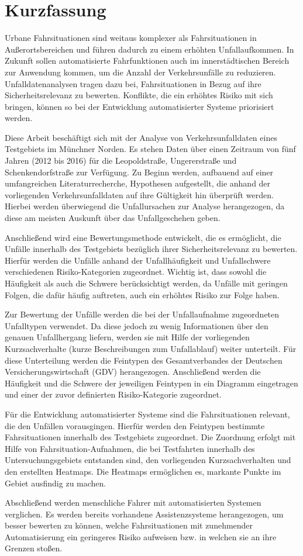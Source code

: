 \chapter{Kurzfassung}


Urbane Fahrsituationen sind weitaus komplexer als Fahrsituationen in Außerortsbereichen und führen dadurch zu einem erhöhten Unfallaufkommen. In Zukunft sollen automatisierte Fahrfunktionen auch im innerstädtischen Bereich zur Anwendung kommen, um die Anzahl der Verkehrsunfälle zu reduzieren. Unfalldatenanalysen tragen dazu bei, Fahrsituationen in Bezug auf ihre Sicherheitsrelevanz zu bewerten. Konflikte, die ein erhöhtes Risiko mit sich bringen, können so bei der Entwicklung automatisierter Systeme priorisiert werden.

Diese Arbeit beschäftigt sich mit der Analyse von Verkehrsunfalldaten eines Testgebiets im Münchner Norden. Es stehen Daten über einen Zeitraum von fünf Jahren (2012 bis 2016) für die Leopoldstraße, Ungererstraße und Schenkendorfstraße zur Verfügung. Zu Beginn werden, aufbauend auf einer umfangreichen Literaturrecherche, Hypothesen aufgestellt, die anhand der vorliegenden Verkehrsunfalldaten auf ihre Gültigkeit hin überprüft werden. Hierbei werden überwiegend die Unfallursachen zur Analyse herangezogen, da diese am meisten Auskunft über das Unfallgeschehen geben.

Anschließend wird eine Bewertungsmethode entwickelt, die es ermöglicht, die Unfälle innerhalb des Testgebiets bezüglich ihrer Sicherheitsrelevanz zu bewerten. Hierfür werden die Unfälle anhand der Unfallhäufigkeit und Unfallschwere verschiedenen Risiko-Kategorien zugeordnet. Wichtig ist, dass sowohl die Häufigkeit als auch die Schwere berücksichtigt werden, da Unfälle mit geringen Folgen, die dafür häufig auftreten, auch ein erhöhtes Risiko zur Folge haben.

Zur Bewertung der Unfälle werden die bei der Unfallaufnahme zugeordneten Unfalltypen verwendet. Da diese jedoch zu wenig Informationen über den genauen Unfallhergang liefern, werden sie mit Hilfe der vorliegenden Kurzsachverhalte (kurze Beschreibungen zum Unfallablauf) weiter unterteilt. Für diese Unterteilung werden die Feintypen des Gesamtverbandes der Deutschen Versicherungswirtschaft (GDV) herangezogen. Anschließend werden die Häufigkeit und die Schwere der jeweiligen Feintypen in ein Diagramm eingetragen und einer der zuvor definierten Risiko-Kategorie zugeordnet.

Für die Entwicklung automatisierter Systeme sind die Fahrsituationen relevant, die den Unfällen vorausgingen. Hierfür werden den Feintypen bestimmte Fahrsituationen innerhalb des Testgebiets zugeordnet. Die Zuordnung erfolgt mit Hilfe von Fahrsituation-Aufnahmen, die bei Testfahrten innerhalb des Untersuchungsgebiets entstanden sind, den vorliegenden Kurzsachverhalten und den erstellten Heatmaps. Die Heatmaps ermöglichen es, markante Punkte im Gebiet ausfindig zu machen.

Abschließend werden menschliche Fahrer mit automatisierten Systemen verglichen. Es werden bereits vorhandene Assistenzsysteme herangezogen, um besser bewerten zu können, welche Fahrsituationen mit zunehmender Automatisierung ein geringeres Risiko aufweisen bzw. in welchen sie an ihre Grenzen stoßen. 
